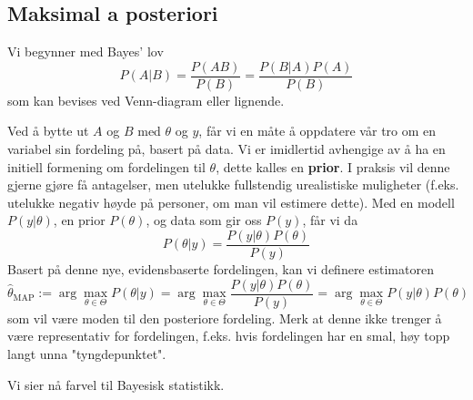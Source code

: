 \subsection{Maksimal a posteriori}
Vi begynner med Bayes' lov
\begin{equation}
P(A | B)=\frac{P(A B)}{P(B)} = \frac{P(B | A) P(A)}{P(B)}
\end{equation}
som kan bevises ved Venn-diagram eller lignende.

Ved å bytte ut $A$ og $B$ med $\theta$ og $y$, får vi en måte å oppdatere vår tro om en variabel sin fordeling på, basert på data. Vi er imidlertid avhengige av å ha en initiell formening om fordelingen til $\theta$, dette kalles en \textbf{prior}. I praksis vil denne gjerne gjøre få antagelser, men utelukke fullstendig urealistiske muligheter (f.eks. utelukke negativ høyde på personer, om man vil estimere dette). Med en modell $P(y | \theta)$, en prior $P(\theta)$, og data som gir oss $P(y)$, får vi da
\begin{equation}
P(\theta | y)=\frac{P(y | \theta) P(\theta)}{P(y)}
\end{equation}
Basert på denne nye, evidensbaserte fordelingen, kan vi definere estimatoren
\begin{equation}
\widehat{\theta}_{\mathrm{MAP}}:=\arg \max _{\theta \in \Theta} P(\theta | y)=\arg \max _{\theta \in \Theta} \frac{P(y | \theta) P(\theta)}{P(y)}=\arg \max _{\theta \in \Theta} P(y | \theta) P(\theta)
\end{equation}
som vil være moden til den posteriore fordeling. Merk at denne ikke trenger å være representativ for fordelingen, f.eks. hvis fordelingen har en smal, høy topp langt unna "tyngdepunktet".

Vi sier nå farvel til Bayesisk statistikk.
